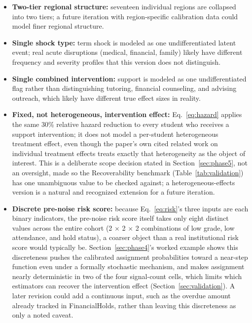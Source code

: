 \documentclass[11pt]{article}
\begin{document}
\begin{itemize}[topsep=2pt,itemsep=3pt,parsep=0pt]
\item \textbf{Two-tier regional structure:} seventeen individual regions are collapsed into two tiers; a future iteration with region-specific calibration data could model finer regional structure.
\item \textbf{Single shock type:} term shock is modeled as one undifferentiated latent event; real acute disruptions (medical, financial, family) likely have different frequency and severity profiles that this version does not distinguish.
\item \textbf{Single combined intervention:} support is modeled as one undifferentiated flag rather than distinguishing tutoring, financial counseling, and advising outreach, which likely have different true effect sizes in reality.
\item \textbf{Fixed, not heterogeneous, intervention effect:} Eq.~\ref{eq:hazard} applies the same 30\% relative hazard reduction to every student who receives a support intervention; it does not model a per-student heterogeneous treatment effect, even though the paper's own cited related work on individual treatment effects \citep{smith2020global} treats exactly that heterogeneity as the object of interest. This is a deliberate scope decision stated in Section~\ref{sec:phase5}, not an oversight, made so the Recoverability benchmark (Table~\ref{tab:validation}) has one unambiguous value to be checked against; a heterogeneous-effects version is a natural and recognized extension for a future iteration.
\item \textbf{Discrete pre-noise risk score:} because Eq.~\ref{eq:risk}'s three inputs are each binary indicators, the pre-noise risk score itself takes only eight distinct values across the entire cohort (2 $\times$ 2 $\times$ 2 combinations of low grade, low attendance, and hold status), a coarser object than a real institutional risk score would typically be. Section~\ref{sec:phase4}'s worked example shows this discreteness pushes the calibrated assignment probabilities toward a near-step function even under a formally stochastic mechanism, and makes assignment nearly deterministic in two of the four signal-count cells, which limits which estimators can recover the intervention effect (Section~\ref{sec:validation}). A later revision could add a continuous input, such as the overdue amount already tracked in FinancialHolds, rather than leaving this discreteness as only a noted caveat.

\end{itemize}
\end{document}
